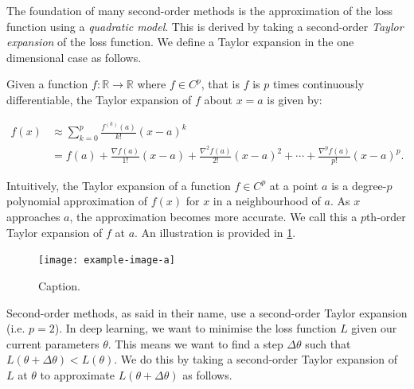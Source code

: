 The foundation of many second-order methods is the approximation of the loss function using a \textit{quadratic model}. This is derived by taking a second-order \textit{Taylor expansion} of the loss function. We define a Taylor expansion in the one dimensional case as follows.

\begin{definition}

    Given a function $f: \mathbb{R} \to \mathbb{R}$ where $f \in C^p$, that is $f$ is $p$ times continuously differentiable, the Taylor expansion of $f$ about $x = a$ is given by:

    \begin{align}

        f(x) 

        &\approx \sum_{k=0}^{p} \frac{f^{(k)}(a)}{k!} (x-a)^k \\

        &= f(a) + \frac{\nabla f(a)}{1!} (x-a) + \frac{\nabla^2 f(a)}{2!} (x-a)^2 + \cdots + \frac{\nabla^p f(a)}{p!} (x-a)^p.

    \end{align}

\end{definition}

Intuitively, the Taylor expansion of a function $f \in C^p$ at a point $a$ is a degree-$p$ polynomial approximation of $f(x)$ for $x$ in a neighbourhood of $a$. As $x$ approaches $a$, the approximation becomes more accurate. We call this a $p$th-order Taylor expansion of $f$ at $a$. An illustration is provided in \cref{fig:taylor_expansion}.




\begin{figure}[h]

    \centering

    \texttt{[image: example-image-a]}

    \caption{Caption.}

    \label{fig:taylor_expansion}

\end{figure}



Second-order methods, as said in their name, use a second-order Taylor expansion (i.e. $p = 2$). In deep learning, we want to minimise the loss function $L$ given our current parameters $\theta$. This means we want to find a step $\Delta \theta$ such that $L(\theta + \Delta \theta) < L(\theta)$. We do this by taking a second-order Taylor expansion of $L$ at $\theta$ to approximate $L(\theta + \Delta \theta)$ as follows.

